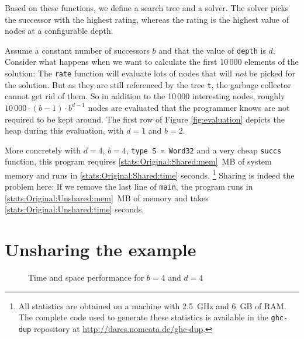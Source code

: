 \documentclass[preprint]{sigplanconf}
\theoremstyle{nonumberplain}
\newcommand{\li}{\lstinline[style=Haskell]}
\newcommand{\ci}{\lstinline[style=Cmm]}
\begin{document}
Based on these functions, we define a search tree and a solver. The solver picks the successor with the highest rating, whereas the rating is the highest value of nodes at a configurable depth.

Assume a constant number of successors $b$ and that the value of \li-depth- is $d$. Consider what happens when we want to calculate the first 10\,000 elements of the solution: The \li-rate- function will evaluate lots of nodes that will \emph{not} be picked for the solution. But as they are still referenced by the tree \li-t-, the garbage collector cannot get rid of them. So in addition to the  10\,000 interesting nodes, roughly $10\,000\cdot (b-1)\cdot b^{d-1}$ nodes are evaluated that the programmer knows are not required to be kept around. The first row of Figure \ref{fig:evaluation} depicts the heap during this evaluation, with $d=1$ and $b=2$.

\newcommand{\stats}[1]{\ref*{#1}}
More concretely with $d=4$, $b=4$, \li-type S = Word32- and a very cheap \li-succs- function, this program requires \stats{stats:Original:Shared:mem}~MB of system memory and runs in \stats{stats:Original:Shared:time} seconds.%
\footnote{All statistics are obtained on a machine with 2.5~GHz and 6~GB of RAM. The complete code used to generate these statistics is available in the \ci!ghc-dup! repository at \url{http://darcs.nomeata.de/ghc-dup}.} Sharing is indeed the problem here: If we remove the last line of \li-main-, the program runs in \stats{stats:Original:Unshared:mem}~MB of memory and takes \stats{stats:Original:Unshared:time} seconds.

\section{Unsharing the example}
\label{sec:unsharing}

\begin{figure*}
\centering

\caption{Time and space performance for $b=4$ and $d=4$}
\label{fig:stats}
\end{figure*}
\end{document}
